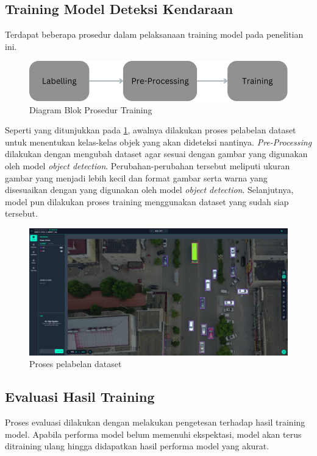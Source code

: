 \subsection{Training Model Deteksi Kendaraan}
Terdapat beberapa prosedur dalam pelaksanaan training model pada penelitian ini.
\begin{figure} [H] \centering
  \includegraphics[scale=0.45]{gambar/Blok Diagram Training.png}
  \caption{Diagram Blok Prosedur Training}
  \label{fig:diagaram_blok_training}
\end{figure}
Seperti yang ditunjukkan pada \ref{fig:diagaram_blok_training}, awalnya dilakukan proses pelabelan dataset untuk menentukan kelas-kelas objek yang akan dideteksi nantinya. \emph{Pre-Processing} dilakukan dengan mengubah dataset agar sesuai dengan gambar yang digunakan oleh model \emph{object detection}. Perubahan-perubahan tersebut meliputi ukuran gambar yang menjadi lebih kecil dan format gambar serta warna yang disesuaikan dengan yang digunakan oleh model \emph{object detection}. Selanjutnya, model pun dilakukan proses training menggunakan dataset yang sudah siap tersebut.
\begin{figure} [H] \centering
  \includegraphics[scale=0.3]{gambar/pelabelan.png}
  \caption{Proses pelabelan dataset}
  \label{fig:pelabelan}
\end{figure}

\subsection{Evaluasi Hasil Training}
Proses evaluasi dilakukan dengan melakukan pengetesan terhadap hasil training model. Apabila performa model belum memenuhi ekspektasi, model akan terus ditraining ulang hingga didapatkan hasil performa model yang akurat.

